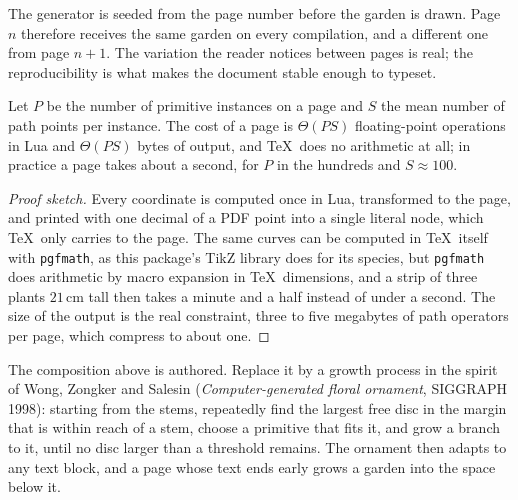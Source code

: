 \begin{remark}
The generator is seeded from the page number before the garden is drawn. Page $n$
therefore receives the same garden on every compilation, and a different one from page
$n+1$. The variation the reader notices between pages is real; the reproducibility is what
makes the document stable enough to typeset.
\end{remark}

\begin{proposition}
Let $P$ be the number of primitive instances on a page and $S$ the mean number of path
points per instance. The cost of a page is $\Theta(PS)$ floating-point operations in Lua and
$\Theta(PS)$ bytes of output, and \TeX\ does no arithmetic at all; in practice a page takes
about a second, for $P$ in the hundreds and $S\approx 100$.
\end{proposition}

\begin{proof}[Proof sketch]
Every coordinate is computed once in Lua, transformed to the page, and printed with one
decimal of a PDF point into a single literal node, which \TeX\ only carries to the page.
The same curves can be computed in \TeX\ itself with \texttt{pgfmath}, as this package's
TikZ library does for its species, but \texttt{pgfmath} does arithmetic by macro expansion in
\TeX\ dimensions, and a strip of three plants $21\,$cm tall then takes a minute and a half
instead of under a second. The size of the output is the real constraint, three to five
megabytes of path operators per page, which compress to about one.
\end{proof}

\begin{exercise}
The composition above is authored. Replace it by a growth process in the spirit of Wong,
Zongker and Salesin (\emph{Computer-generated floral ornament}, SIGGRAPH 1998): starting
from the stems, repeatedly find the largest free disc in the margin that is within reach of
a stem, choose a primitive that fits it, and grow a branch to it, until no disc larger than
a threshold remains. The ornament then adapts to any text block, and a page whose text
ends early grows a garden into the space below it.
\end{exercise}
